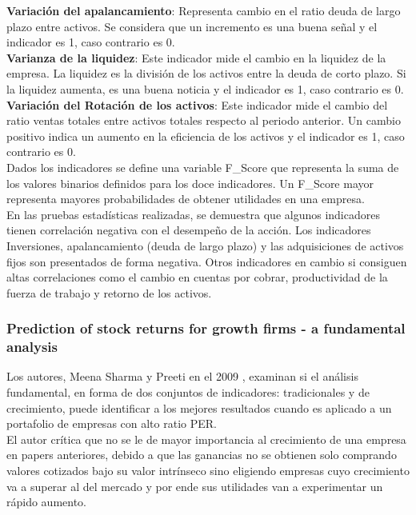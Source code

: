 \textbf{Variaci\'on del apalancamiento}: Representa cambio en el ratio deuda de largo plazo entre activos. Se considera que un incremento es una buena señal y el indicador es 1, caso contrario es 0.\\

\textbf{Varianza de la liquidez}: Este indicador mide el cambio en la liquidez de la empresa. La liquidez es la división de los activos entre la deuda de corto plazo. Si la liquidez aumenta, es una buena noticia y el indicador es 1, caso contrario es 0.\\

\textbf{Variaci\'on del Rotación de los activos}: Este indicador mide el cambio del ratio ventas totales entre activos totales respecto al periodo anterior. Un cambio positivo indica un aumento en la eficiencia de los activos y el indicador es 1, caso contrario es 0.\\

Dados los indicadores se define una variable F\_Score que representa la suma de los valores binarios definidos para los doce indicadores. Un F\_Score mayor representa mayores  probabilidades de obtener utilidades en una empresa.\\

En las pruebas estadísticas realizadas, se demuestra que algunos indicadores tienen correlación negativa con el desempeño de la acción. Los indicadores Inversiones, apalancamiento (deuda de largo plazo) y las adquisiciones de activos fijos son presentados de forma negativa. Otros indicadores en cambio si consiguen altas correlaciones como el cambio en cuentas por cobrar, productividad de la fuerza de trabajo y retorno de los activos.\\

\subsubsection{Prediction of stock returns for growth firms - a fundamental analysis}

Los autores, Meena Sharma y Preeti en el 2009 \cite{Preeti2009}, examinan si el análisis fundamental, en forma de dos conjuntos de indicadores: tradicionales y de crecimiento, puede identificar a los mejores resultados cuando es aplicado a un portafolio de empresas con alto ratio PER.\\

El autor crítica que no se le de mayor importancia al crecimiento de una empresa en papers anteriores, debido a que las ganancias no se obtienen solo comprando valores cotizados bajo su valor intrínseco sino eligiendo empresas cuyo crecimiento va a superar al del mercado y por ende sus utilidades van a experimentar un rápido aumento.\\

